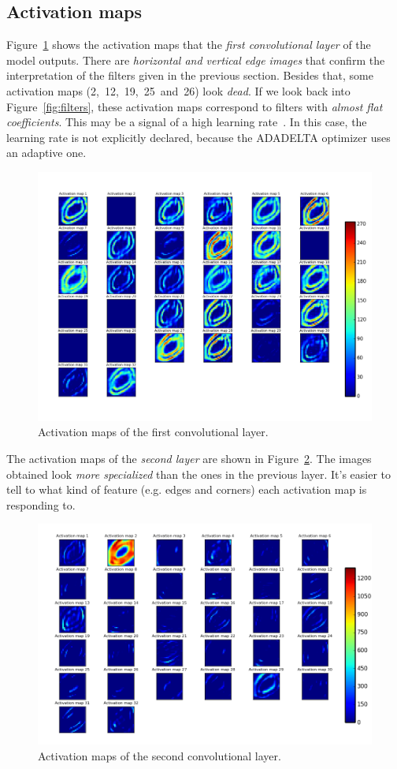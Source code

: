 \subsection{Activation maps}
Figure~\ref{fig:activation_maps} shows the activation maps that the \emph{first convolutional layer} of the model outputs. There are \emph{horizontal and vertical edge images} that confirm the interpretation of the filters given in the previous section. Besides that, some activation maps (2,~12,~19,~25~and~26) look \textit{dead}. If we look back into Figure~\ref{fig:filters}, these activation maps correspond to filters with \emph{almost flat coefficients}. This may be a signal of a high learning rate~\cite{cs231n}. In this case, the learning rate is not explicitly declared, because the ADADELTA optimizer uses an adaptive one.
\begin{figure}
	\centering
	\includegraphics[width=0.9\linewidth, keepaspectratio]{figures/activation_maps_conv2d_1.png}
	\caption{Activation maps of the first convolutional layer.}
	\label{fig:activation_maps}
\end{figure}

The activation maps of the \emph{second layer} are shown in Figure~\ref{fig:activation_maps2}. The images obtained look \emph{more specialized} than the ones in the previous layer. It's easier to tell to what kind of feature (e.g. edges and corners) each activation map is responding to.
\begin{figure}
	\centering
	\includegraphics[width=0.9\linewidth, keepaspectratio]{figures/activation_maps_conv2d_2.png}
	\caption{Activation maps of the second convolutional layer.}
	\label{fig:activation_maps2}
\end{figure}

